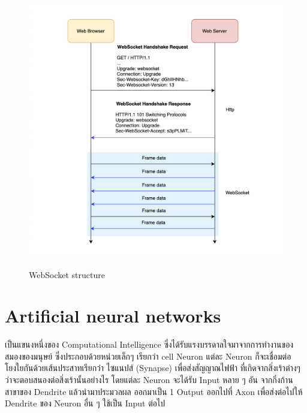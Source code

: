 \begin{figure}[h]
  \begin{center}

    \includegraphics[scale=0.3]{pic/websocket-works-2.png}\cite{WebSocket}
  \end{center}

  \caption[WebSocket structure]{WebSocket structure}
  \label{fig:WebSocket structure}
\end{figure}

\newpage


\section{Artificial neural networks \cite{ANN}}
\par เป็นแขนงหนึ่งของ Computational Intelligence ซึ่งได้รับแรงบรรดาลใจมาจากการทำงานของสมองของมนุษย์
ซึ่งประกอบด้วยหน่วยเล็กๆ เรียกว่า cell Neuron แต่ละ Neuron ก็จะเชื่อมต่อโยงใยกันด้วยเส้นประสาทเรียกว่า ไซแนปส์ (Synapse) เพื่อส่งสัญญาณไฟฟ้า ที่เกิดจากสิ่งเร้าต่างๆ ว่าจะตอบสนองต่อสิ่งเร้านั้นอย่างไร
โดยแต่ละ Neuron จะได้รับ Input หลาย ๆ อัน จากกิ่งก้านสาขาของ Dendrite แล้วนำมาประมวลผล ออกมาเป็น 1 Output ออกไปที่ Axon เพื่อส่งต่อไปให้ Dendrite ของ Neuron อื่น ๆ ใช้เป็น Input ต่อไป

